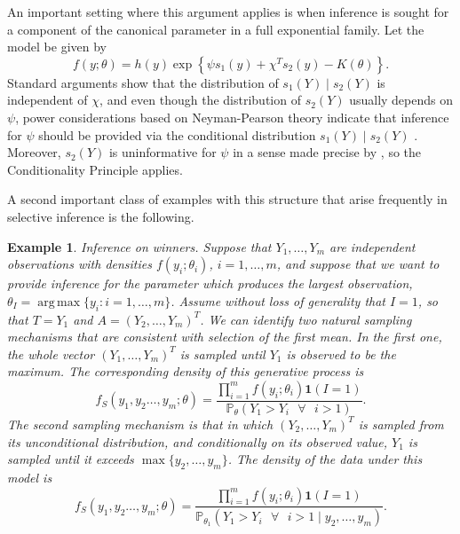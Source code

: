 \documentclass[pdflatex,sn-chicago]{sn-jnl}%
\DeclareMathOperator*{\argmax}{arg\,max}
\theoremstyle{thmstyleone}%
\theoremstyle{thmstyletwo}%
\newtheorem{example}{Example}%
\theoremstyle{thmstylethree}%
\begin{document}
An important setting where this argument applies is when inference is sought for a component of the canonical parameter in a full exponential family. Let the model be given by
\begin{equation*}
f(y; \theta) = h(y) \exp\left\{ \psi s_1(y) + \chi^T s_2(y) - K(\theta) \right\}.
\end{equation*}
Standard arguments show that the distribution of $s_1(Y) \mid s_2(Y) $ is independent of $\chi$, and even though the distribution of $s_2(Y)$ usually depends on $\psi$, power considerations based on Neyman-Pearson theory indicate that inference for $\psi$ should be provided via the conditional distribution $s_1(Y) \mid s_2(Y) $ \cite[][Chapter 7]{youngsmith}. Moreover, $s_2(Y)$ is uninformative for $\psi$ in a sense made precise by \cite{jorgensen}, so the Conditionality Principle applies. 

A second important class of examples with this structure that arise frequently in selective inference is the following.

\begin{example} \label{EX: winners}
\textit{Inference on winners}. Suppose that $Y_1, \ldots, Y_m$ are independent observations with densities $f(y_i; \theta_i)$, $i = 1, \ldots, m$, and suppose that we want to provide inference for the parameter which produces the largest observation, $\theta_I = \argmax\{y_i\colon i = 1, \ldots, m\}$. Assume without loss of generality that $I = 1$, so that $T = Y_1$ and $A = (Y_2, \ldots, Y_m)^T$. We can identify two natural sampling mechanisms that are consistent with selection of the first mean. In the first one, the whole vector $(Y_1, \ldots, Y_m)^T$ is sampled until $Y_1$ is observed to be the maximum. The corresponding density of this generative process is
\begin{equation} \label{EQ: selmean1}
f_S(y_1, y_2\ldots, y_m; \theta) = \frac{\prod_{i=1}^m f(y_i; \theta_i) \mathbf{1}(I = 1)}{\mathbb{P}_\theta(Y_1 > Y_i \text{ }\forall \text{ } i>1)}.
\end{equation}
The second sampling mechanism is that in which $(Y_2, \ldots, Y_m)^T$ is sampled from its unconditional distribution, and conditionally on its observed value, $Y_1$ is sampled until it exceeds $\max\{ y_2, \ldots, y_m\}$. The density of the data under this model is
\begin{equation} \label{EQ: selmean2}
f_S(y_1, y_2\ldots, y_m; \theta) = \frac{\prod_{i=1}^m f(y_i; \theta_i) \mathbf{1}(I = 1)}{\mathbb{P}_{\theta_1}(Y_1 > Y_i \text{ }\forall \text{ } i>1\mid y_2, \ldots, y_m)}.
\end{equation}
\end{example}
\end{document}
